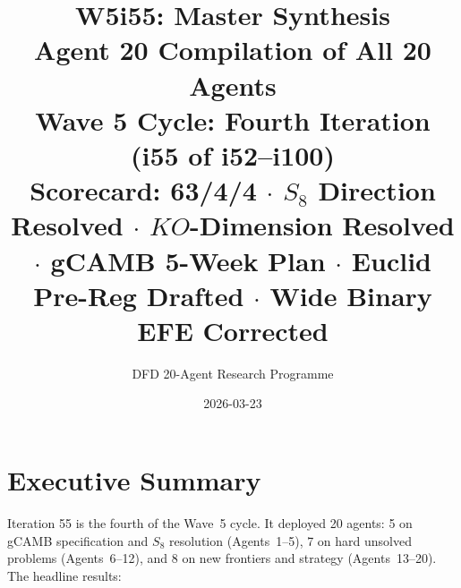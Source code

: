 \documentclass[11pt,a4paper]{article}
\title{\Huge W5i55: Master Synthesis\\[12pt]
\Large Agent 20 Compilation of All 20 Agents\\[6pt]
\large Wave 5 Cycle: Fourth Iteration (i55 of i52--i100)\\[6pt]
\normalsize Scorecard: 63/4/4 $\cdot$ $S_8$ Direction Resolved $\cdot$ $KO$-Dimension Resolved $\cdot$ gCAMB 5-Week Plan $\cdot$ Euclid Pre-Reg Drafted $\cdot$ Wide Binary EFE Corrected}
\author{DFD 20-Agent Research Programme}
\date{2026-03-23}
\begin{document}
\maketitle


\section{Executive Summary}

Iteration 55 is the fourth of the Wave~5 cycle. It deployed 20 agents: 5 on gCAMB specification and $S_8$ resolution (Agents~1--5), 7 on hard unsolved problems (Agents~6--12), and 8 on new frontiers and strategy (Agents~13--20). The headline results:
\end{document}

